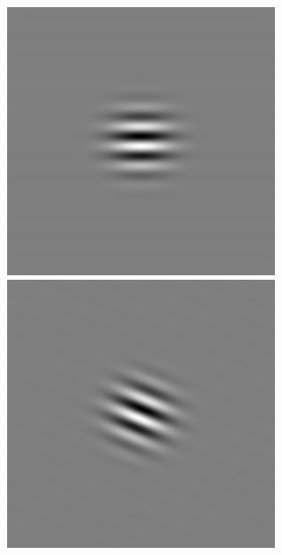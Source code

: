 \begin{figure}[ht]
\begin{center}
 \includegraphics[width=\columnwidth/9]{ch4/figures/rGabor4_4.jpg}
 \includegraphics[width=\columnwidth/9]{ch4/figures/rGabor4_5.jpg}

\end{center}
\end{figure}
